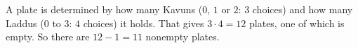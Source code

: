 A plate is determined by how many Kavuns ($0$, $1$ or $2$: $3$ choices) and how many Laddus ($0$ to $3$: $4$ choices) it holds. That gives $3\cdot4=12$ plates, one of which is empty. So there are $12-1=\boxed{11}$ nonempty plates.
